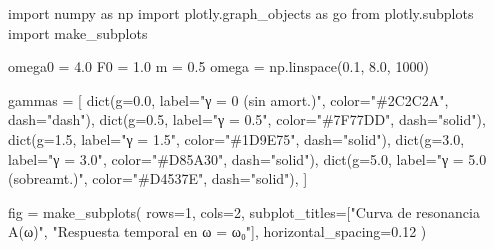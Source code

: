 \documentclass[
  letterpaper,
  DIV=11,
  numbers=noendperiod]{scrreprt}
\newenvironment{Shaded}{\begin{snugshade}}{\end{snugshade}}
\newcommand{\BuiltInTok}[1]{\textcolor[rgb]{0.00,0.23,0.31}{#1}}
\newcommand{\DecValTok}[1]{\textcolor[rgb]{0.68,0.00,0.00}{#1}}
\newcommand{\FloatTok}[1]{\textcolor[rgb]{0.68,0.00,0.00}{#1}}
\newcommand{\ImportTok}[1]{\textcolor[rgb]{0.00,0.46,0.62}{#1}}
\newcommand{\NormalTok}[1]{\textcolor[rgb]{0.00,0.23,0.31}{#1}}
\newcommand{\OperatorTok}[1]{\textcolor[rgb]{0.37,0.37,0.37}{#1}}
\newcommand{\StringTok}[1]{\textcolor[rgb]{0.13,0.47,0.30}{#1}}
\begin{document}
\begin{Shaded}
\begin{Highlighting}[]
\ImportTok{import}\NormalTok{ numpy }\ImportTok{as}\NormalTok{ np}
\ImportTok{import}\NormalTok{ plotly.graph\_objects }\ImportTok{as}\NormalTok{ go}
\ImportTok{from}\NormalTok{ plotly.subplots }\ImportTok{import}\NormalTok{ make\_subplots}

\NormalTok{omega0 }\OperatorTok{=} \FloatTok{4.0}
\NormalTok{F0     }\OperatorTok{=} \FloatTok{1.0}
\NormalTok{m      }\OperatorTok{=} \FloatTok{0.5}
\NormalTok{omega  }\OperatorTok{=}\NormalTok{ np.linspace(}\FloatTok{0.1}\NormalTok{, }\FloatTok{8.0}\NormalTok{, }\DecValTok{1000}\NormalTok{)}

\NormalTok{gammas }\OperatorTok{=}\NormalTok{ [}
    \BuiltInTok{dict}\NormalTok{(g}\OperatorTok{=}\FloatTok{0.0}\NormalTok{,  label}\OperatorTok{=}\StringTok{"γ = 0 (sin amort.)"}\NormalTok{,   color}\OperatorTok{=}\StringTok{"\#2C2C2A"}\NormalTok{,  dash}\OperatorTok{=}\StringTok{"dash"}\NormalTok{),}
    \BuiltInTok{dict}\NormalTok{(g}\OperatorTok{=}\FloatTok{0.5}\NormalTok{,  label}\OperatorTok{=}\StringTok{"γ = 0.5"}\NormalTok{,               color}\OperatorTok{=}\StringTok{"\#7F77DD"}\NormalTok{,  dash}\OperatorTok{=}\StringTok{"solid"}\NormalTok{),}
    \BuiltInTok{dict}\NormalTok{(g}\OperatorTok{=}\FloatTok{1.5}\NormalTok{,  label}\OperatorTok{=}\StringTok{"γ = 1.5"}\NormalTok{,               color}\OperatorTok{=}\StringTok{"\#1D9E75"}\NormalTok{,  dash}\OperatorTok{=}\StringTok{"solid"}\NormalTok{),}
    \BuiltInTok{dict}\NormalTok{(g}\OperatorTok{=}\FloatTok{3.0}\NormalTok{,  label}\OperatorTok{=}\StringTok{"γ = 3.0"}\NormalTok{,               color}\OperatorTok{=}\StringTok{"\#D85A30"}\NormalTok{,  dash}\OperatorTok{=}\StringTok{"solid"}\NormalTok{),}
    \BuiltInTok{dict}\NormalTok{(g}\OperatorTok{=}\FloatTok{5.0}\NormalTok{,  label}\OperatorTok{=}\StringTok{"γ = 5.0 (sobreamt.)"}\NormalTok{,   color}\OperatorTok{=}\StringTok{"\#D4537E"}\NormalTok{,  dash}\OperatorTok{=}\StringTok{"solid"}\NormalTok{),}
\NormalTok{]}

\NormalTok{fig }\OperatorTok{=}\NormalTok{ make\_subplots(}
\NormalTok{    rows}\OperatorTok{=}\DecValTok{1}\NormalTok{, cols}\OperatorTok{=}\DecValTok{2}\NormalTok{,}
\NormalTok{    subplot\_titles}\OperatorTok{=}\NormalTok{[}\StringTok{"Curva de resonancia A(ω)"}\NormalTok{, }\StringTok{"Respuesta temporal en ω = ω₀"}\NormalTok{],}
\NormalTok{    horizontal\_spacing}\OperatorTok{=}\FloatTok{0.12}
\NormalTok{)}


\end{Highlighting}
\end{Shaded}
\end{document}
